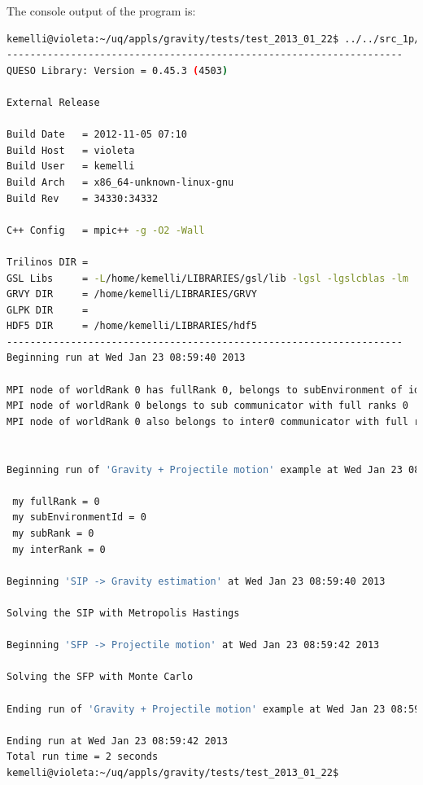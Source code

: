  
The console output of the program is:
\begin{lstlisting}[caption={Console output of program \texttt{gravity\_gsl}}, label={code:console_output},language={bash}]
kemelli@violeta:~/uq/appls/gravity/tests/test_2013_01_22$ ../../src_1p/gravity_gsl gravity_inv_fwd.inp 
--------------------------------------------------------------------
QUESO Library: Version = 0.45.3 (4503)

External Release

Build Date   = 2012-11-05 07:10
Build Host   = violeta
Build User   = kemelli
Build Arch   = x86_64-unknown-linux-gnu
Build Rev    = 34330:34332

C++ Config   = mpic++ -g -O2 -Wall

Trilinos DIR = 
GSL Libs     = -L/home/kemelli/LIBRARIES/gsl/lib -lgsl -lgslcblas -lm
GRVY DIR     = /home/kemelli/LIBRARIES/GRVY
GLPK DIR     = 
HDF5 DIR     = /home/kemelli/LIBRARIES/hdf5
--------------------------------------------------------------------
Beginning run at Wed Jan 23 08:59:40 2013

MPI node of worldRank 0 has fullRank 0, belongs to subEnvironment of id 0, and has subRank 0
MPI node of worldRank 0 belongs to sub communicator with full ranks 0
MPI node of worldRank 0 also belongs to inter0 communicator with full ranks 0, and has inter0Rank 0


Beginning run of 'Gravity + Projectile motion' example at Wed Jan 23 08:59:40 2013

 my fullRank = 0
 my subEnvironmentId = 0
 my subRank = 0
 my interRank = 0

Beginning 'SIP -> Gravity estimation' at Wed Jan 23 08:59:40 2013

Solving the SIP with Metropolis Hastings

Beginning 'SFP -> Projectile motion' at Wed Jan 23 08:59:42 2013

Solving the SFP with Monte Carlo

Ending run of 'Gravity + Projectile motion' example at Wed Jan 23 08:59:42 2013

Ending run at Wed Jan 23 08:59:42 2013
Total run time = 2 seconds
kemelli@violeta:~/uq/appls/gravity/tests/test_2013_01_22$ 
\end{lstlisting}


